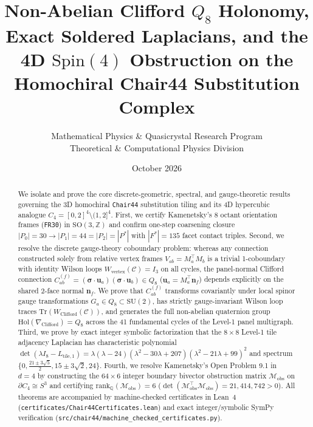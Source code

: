 \documentclass[11pt,a4paper]{article}
\title{\textbf{Non-Abelian Clifford $Q_8$ Holonomy, Exact Soldered Laplacians, and the 4D $\mathrm{Spin}(4)$ Obstruction on the Homochiral Chair44 Substitution Complex}}
\author{Mathematical Physics \& Quasicrystal Research Program \\ \small Theoretical \& Computational Physics Division}
\date{October 2026}
\theoremstyle{definition}
\begin{document}
\maketitle

\begin{abstract}
We isolate and prove the core discrete-geometric, spectral, and gauge-theoretic results governing the 3D homochiral \texttt{Chair44} substitution tiling and its 4D hypercubic analogue $C_4 = [0,2]^4 \setminus (1,2]^4$. First, we certify Kamenetsky's 8 octant orientation frames (\texttt{FR30}) in $\mathrm{SO}(3,\mathbb{Z})$ and confirm one-step coarsening closure $|P_0| = 30 \to |P_1| = 44 = |P_2| = |P^*|$ with $|F^*| = 135$ facet contact triples. Second, we resolve the discrete gauge-theory coboundary problem: whereas any connection constructed solely from relative vertex frames $V_{ab} = M_a^\top M_b$ is a trivial 1-coboundary with identity Wilson loops $W_{\mathrm{vertex}}(\mathcal{C}) = I_3$ on all cycles, the panel-normal Clifford connection $C_{ab}^{(f)} = (\boldsymbol{\sigma}\cdot \mathbf{u}_a)(\boldsymbol{\sigma}\cdot \mathbf{u}_b) \in Q_8$ ($\mathbf{u}_a = M_a^\top \mathbf{n}_f$) depends explicitly on the shared 2-face normal $\mathbf{n}_f$. We prove that $C_{ab}^{(f)}$ transforms covariantly under local spinor gauge transformations $G_a \in Q_8 \subset \mathrm{SU}(2)$, has strictly gauge-invariant Wilson loop traces $\mathrm{Tr}(W_{\mathrm{Clifford}}(\mathcal{C}))$, and generates the full non-abelian quaternion group $\mathrm{Hol}(\nabla_{\mathrm{Clifford}}) = Q_8$ across the 41 fundamental cycles of the Level-1 panel multigraph. Third, we prove by exact integer symbolic factorization that the $8\times 8$ Level-1 tile adjacency Laplacian has characteristic polynomial $\det(\lambda I_8 - L_{\mathrm{tile},1}) = \lambda(\lambda - 24)(\lambda^2 - 30\lambda + 207)(\lambda^2 - 21\lambda + 99)^2$ and spectrum $\{0, \frac{21\pm 3\sqrt{5}}{2}, 15\pm 3\sqrt{2}, 24\}$. Fourth, we resolve Kamenetsky's Open Problem 9.1 in $d=4$ by constructing the $64\times 6$ integer boundary bivector obstruction matrix $\mathcal{M}_{\mathrm{obs}}$ on $\partial C_4 \cong S^3$ and certifying $\mathrm{rank}_{\mathbb{Q}}(\mathcal{M}_{\mathrm{obs}}) = 6$ ($\det(\mathcal{M}_{\mathrm{obs}}^\top \mathcal{M}_{\mathrm{obs}}) = 21{,}414{,}742 > 0$). All theorems are accompanied by machine-checked certificates in Lean~4 (\texttt{certificates/Chair44Certificates.lean}) and exact integer/symbolic SymPy verification (\texttt{src/chair44/machine\_checked\_certificates.py}).
\end{abstract}
\end{document}
